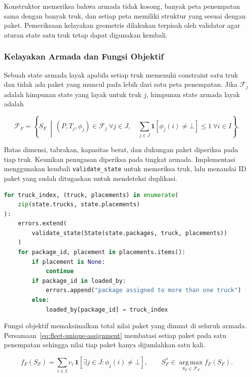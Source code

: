 Konstruktor memeriksa bahwa armada tidak kosong, banyak peta penempatan sama dengan banyak truk, dan setiap peta memiliki struktur yang sesuai dengan paket. Pemeriksaan kelayakan geometris dilakukan terpisah oleh validator agar aturan state satu truk tetap dapat digunakan kembali.

\subsubsection{Kelayakan Armada dan Fungsi Objektif}

Sebuah state armada layak apabila setiap truk memenuhi constraint satu truk dan tidak ada paket yang muncul pada lebih dari satu peta penempatan. Jika $\mathcal{F}_j$ adalah himpunan state yang layak untuk truk $j$, himpunan state armada layak adalah

\begin{equation}
    \mathcal{F}_F = \left\{S_F\;\middle|\,
    (P,T_j,\phi_j)\in\mathcal{F}_j\ \forall j\in J,
    \quad \sum_{j\in J}\mathbf{1}[\phi_j(i)\neq\bot]\leq 1\ \forall i\in I
    \right\}.
    \label{eq:fleet-feasible-set}
\end{equation}

Batas dimensi, tabrakan, kapasitas berat, dan dukungan paket diperiksa pada tiap truk. Keunikan penugasan diperiksa pada tingkat armada. Implementasi menggunakan kembali \texttt{validate\_state} untuk memeriksa truk, lalu menandai ID paket yang sudah ditugaskan untuk mendeteksi duplikasi.

\begin{lstlisting}[language=Python, caption={Validasi lokal dan keunikan paket pada armada},label={lst:fleet-validation}]
for truck_index, (truck, placements) in enumerate(
    zip(state.trucks, state.placements)
):
    errors.extend(
        validate_state(State(state.packages, truck, placements))
    )
    for package_id, placement in placements.items():
        if placement is None:
            continue
        if package_id in loaded_by:
            errors.append("package assigned to more than one truck")
        else:
            loaded_by[package_id] = truck_index
\end{lstlisting}

Fungsi objektif memaksimalkan total nilai paket yang dimuat di seluruh armada. Persamaan~\ref{eq:fleet-unique-assignment} membatasi setiap paket pada satu penempatan sehingga nilai tiap paket hanya dijumlahkan satu kali.

\begin{equation}
    f_F(S_F) = \sum_{i\in I} v_i\,
    \mathbf{1}\!\left[\exists j\in J:\phi_j(i)\neq\bot\right],
    \qquad
    S_F^*\in\operatorname*{arg\,max}_{S_F\in\mathcal{F}_F} f_F(S_F).
    \label{eq:fleet-objective}
\end{equation}

